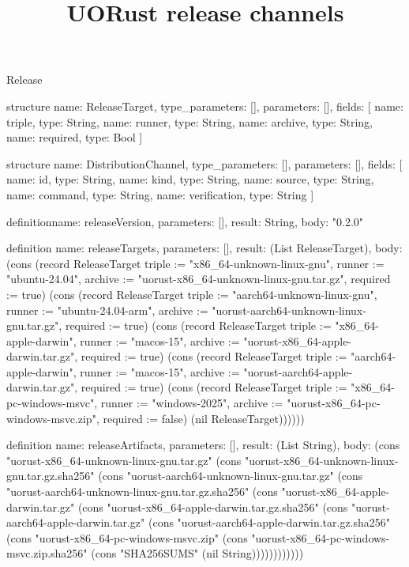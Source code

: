 \begin{lexlean}{Release}
\title{UORust release channels}
\begin{semanticmodule}
structure{
  name: ReleaseTarget,
  type_parameters: [],
  parameters: [],
  fields: [
    {name: triple, type: String},
    {name: runner, type: String},
    {name: archive, type: String},
    {name: required, type: Bool}
  ]
}

structure{
  name: DistributionChannel,
  type_parameters: [],
  parameters: [],
  fields: [
    {name: id, type: String},
    {name: kind, type: String},
    {name: source, type: String},
    {name: command, type: String},
    {name: verification, type: String}
  ]
}

definition{name: releaseVersion, parameters: [], result: String, body: "0.2.0"}

definition{
  name: releaseTargets,
  parameters: [],
  result: (List ReleaseTarget),
  body: (cons (record ReleaseTarget {triple := "x86_64-unknown-linux-gnu", runner := "ubuntu-24.04", archive := "uorust-x86_64-unknown-linux-gnu.tar.gz", required := true}) (cons (record ReleaseTarget {triple := "aarch64-unknown-linux-gnu", runner := "ubuntu-24.04-arm", archive := "uorust-aarch64-unknown-linux-gnu.tar.gz", required := true}) (cons (record ReleaseTarget {triple := "x86_64-apple-darwin", runner := "macos-15", archive := "uorust-x86_64-apple-darwin.tar.gz", required := true}) (cons (record ReleaseTarget {triple := "aarch64-apple-darwin", runner := "macos-15", archive := "uorust-aarch64-apple-darwin.tar.gz", required := true}) (cons (record ReleaseTarget {triple := "x86_64-pc-windows-msvc", runner := "windows-2025", archive := "uorust-x86_64-pc-windows-msvc.zip", required := false}) (nil ReleaseTarget))))))
}

definition{
  name: releaseArtifacts,
  parameters: [],
  result: (List String),
  body: (cons "uorust-x86_64-unknown-linux-gnu.tar.gz" (cons "uorust-x86_64-unknown-linux-gnu.tar.gz.sha256" (cons "uorust-aarch64-unknown-linux-gnu.tar.gz" (cons "uorust-aarch64-unknown-linux-gnu.tar.gz.sha256" (cons "uorust-x86_64-apple-darwin.tar.gz" (cons "uorust-x86_64-apple-darwin.tar.gz.sha256" (cons "uorust-aarch64-apple-darwin.tar.gz" (cons "uorust-aarch64-apple-darwin.tar.gz.sha256" (cons "uorust-x86_64-pc-windows-msvc.zip" (cons "uorust-x86_64-pc-windows-msvc.zip.sha256" (cons "SHA256SUMS" (nil String))))))))))))
}


\end{semanticmodule}
\end{lexlean}
